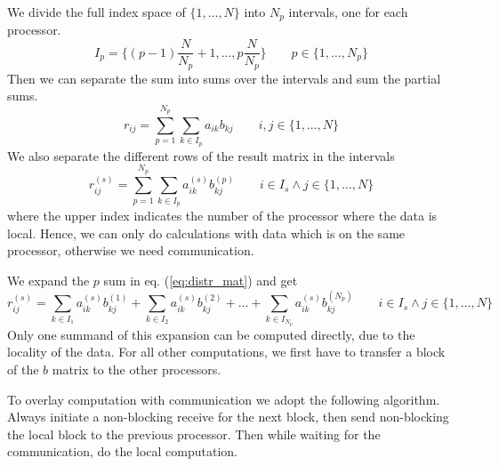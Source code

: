 We divide the full index space of $\{1,\ldots,N\}$ into $N_p$
intervals, one for each processor.
\begin{displaymath}
  I_p=\{(p-1)\frac{N}{N_p}+1,\ldots,p\frac{N}{N_p}\}\qquad p\in\{1,\ldots,N_p\}
\end{displaymath}
Then we can separate the sum into sums over the intervals and sum the
partial sums.
\begin{displaymath}
  r_{ij}=\sum_{p=1}^{N_p}\sum_{k\in I_p} a_{ik} b_{kj}\qquad i,j\in\{1,\ldots,N\}
\end{displaymath}
We also separate the different rows of the result matrix in the
intervals
\begin{equation}
  \label{eq:distr_mat}
  r_{ij}^{(s)}=\sum_{p=1}^{N_p}\sum_{k\in I_p} a_{ik}^{(s)}
  b_{kj}^{(p)}\qquad i\in I_s \wedge j\in\{1,\ldots,N\}
\end{equation}
where the upper index indicates the number of the processor where the
data is local.
Hence, we can only do calculations with data which is on the same
processor, otherwise we need communication.

We expand the $p$ sum in eq. (\ref{eq:distr_mat}) and get
\begin{equation}
  \label{eq:distr_mat_exp}
  r_{ij}^{(s)}=\sum_{k\in I_1} a_{ik}^{(s)}b_{kj}^{(1)}
  +\sum_{k\in I_2} a_{ik}^{(s)}b_{kj}^{(2)}
  +\ldots
  +\sum_{k\in I_{N_p}} a_{ik}^{(s)}b_{kj}^{({N_p})}
  \qquad i\in I_s \wedge j\in\{1,\ldots,N\}
\end{equation}
Only one summand of this expansion can be computed directly, due to
the locality of the data. For all other computations, we first have to
transfer a block of the $b$ matrix to the other processors.

To overlay computation with communication we adopt the following
algorithm. Always initiate a non-blocking receive for the next block,
then send non-blocking the local block to the previous processor. Then
while waiting for the communication, do the local computation.

